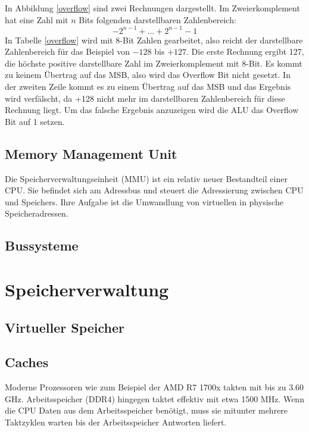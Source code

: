 \documentclass[12pt]{article}
\begin{document}
In Abbildung \ref{overflow} sind zwei Rechnungen dargestellt. Im Zweierkomplement hat eine Zahl mit $n$ Bits folgenden darstellbaren Zahlenbereich: 
$${-2}^{n-1}+ ... +2^{n-1}-1$$
In Tabelle \ref{overflow} wird mit 8-Bit Zahlen gearbeitet, also reicht der darstellbare Zahlenbereich für das Beispiel von $-128$ bis $+127$. Die erste Rechnung ergibt 127, die höchste positive darstellbare Zahl im Zweierkomplement mit 8-Bit. Es kommt zu keinem Übertrag auf das MSB, also wird das Overflow Bit nicht gesetzt. In der zweiten Zeile kommt es zu einem Übertrag auf das MSB und das Ergebnis wird verfälscht, da +128 nicht mehr im darstellbaren Zahlenbereich für diese Rechnung liegt. Um das falsche Ergebnis anzuzeigen wird die ALU das Overflow Bit auf 1 setzen. 


\subsection{Memory Management Unit}
Die Speicherverwaltungseinheit (MMU) ist ein relativ neuer Bestandteil einer CPU. Sie befindet sich am Adressbus und steuert die Adressierung zwischen CPU und Speichers. Ihre Aufgabe ist die Umwandlung von virtuellen in physische Speicheradressen.  
\subsection{Bussysteme}

\section{Speicherverwaltung}

\subsection{Virtueller Speicher}
\subsection{Caches}
Moderne Prozessoren wie zum Beispiel der AMD R7 1700x takten mit bis zu 3.60 GHz. Arbeitsspeicher (DDR4) hingegen taktet effektiv mit etwa 1500 MHz. Wenn die CPU Daten aus dem Arbeitsspeicher benötigt, muss sie mitunter mehrere Taktzyklen warten bis der Arbeitsspeicher Antworten liefert.
\end{document}
